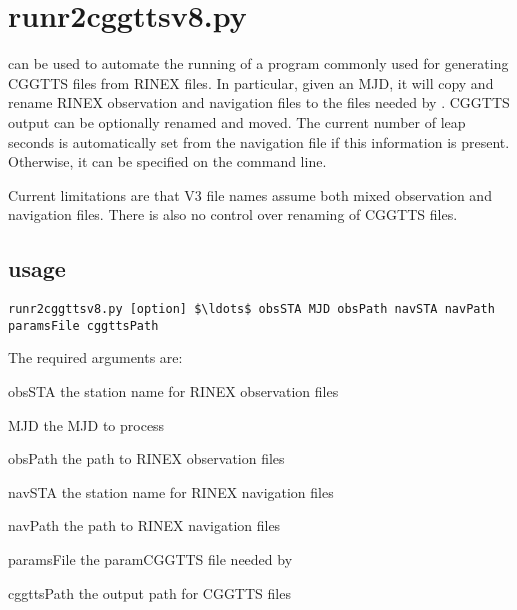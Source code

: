 
\section{runr2cggttsv8.py}

\hypertarget{h:runr2cggttsv8}{}

  can be used to automate the running of
 a program commonly used for generating CGGTTS files from RINEX files.
In particular, given an MJD, it will copy and rename RINEX observation and navigation files
to the files needed by . CGGTTS output can be optionally renamed and moved.
The current number of leap seconds is automatically set from the navigation file if this
information is present. Otherwise, it can be specified on the command line.

Current limitations are that V3 file names assume both mixed observation and navigation files.
There is also no control over renaming of CGGTTS files. 

\subsection{usage}

\begin{lstlisting}[mathescape=true]
runr2cggttsv8.py [option] $\ldots$ obsSTA MJD obsPath navSTA navPath paramsFile cggttsPath
\end{lstlisting}

The required arguments are:
\begin{description*}
\item[obsSTA] the station name for RINEX observation files 
\item[MJD] the MJD to process
\item[obsPath] the path to RINEX observation files
\item[navSTA] the station name for RINEX navigation files
\item[navPath] the path to RINEX navigation files
\item[paramsFile] the paramCGGTTS file needed by 
\item[cggttsPath] the output path for CGGTTS files
\end{description*}

